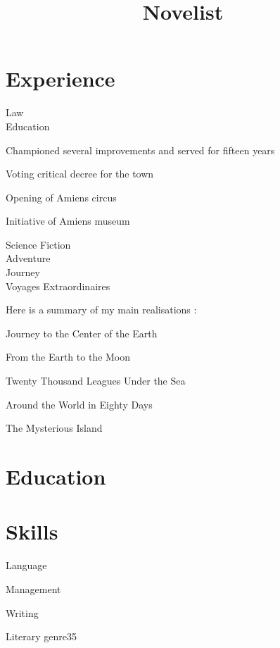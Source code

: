 \documentclass[a4paper,11pt]{cvamm}%
\title{Novelist}
\begin{document}
\section{Experience}
{Law\\Education}
	{ Championed several improvements and served for fifteen years
	\begin{missions}
		\item Voting critical decree for the town
		\item Opening of Amiens circus
		\item Initiative of Amiens museum
	\end{missions}
}
	{Science Fiction\\Adventure\\Journey\\Voyages Extraordinaires}
	{Here is a summary of my main realisations :
	\begin{missions}
		\item Journey to the Center of the Earth
		\item From the Earth to the Moon 
		\item Twenty Thousand Leagues Under the Sea
		\item Around the World in Eighty Days
		\item The Mysterious Island
	\end{missions}
}
\section{Education}
\section{Skills}
\begin{skills} {Language}
\end{skills}
\begin{skills}{Management}
\end{skills}
\begin{skills}{Writing}
\end{skills}
\begin{fields}{Literary genre}{3}{5}
\end{fields}
\end{document}
